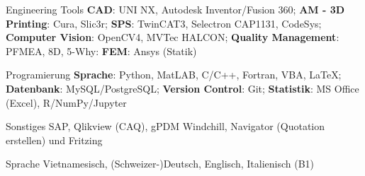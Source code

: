 

\begin{cvskills}


  \cvskill
    {Engineering Tools} %
    {\textbf{CAD}: UNI NX, Autodesk Inventor/Fusion 360; 
    \newline \textbf{AM - 3D Printing}: Cura, Slic3r;
    \newline \textbf{SPS}: TwinCAT3, Selectron CAP1131, CodeSys;
    \newline \textbf{Computer Vision}: OpenCV4, MVTec HALCON;
    \newline \textbf{Quality Management}: PFMEA, 8D, 5-Why:
	\newline \textbf{FEM}: Ansys (Statik)} %

%

  \cvskill
    {Programierung} %
    {\textbf{Sprache}: Python, MatLAB, C/C++, Fortran, VBA, LaTeX; 
    	\newline \textbf{Datenbank}: MySQL/PostgreSQL;
    	\newline \textbf{Version Control}: Git;
    	\newline \textbf{Statistik}: MS Office (Excel), R/NumPy/Jupyter
    	} %

  \cvskill
    {Sonstiges} %
    {SAP, Qlikview (CAQ), gPDM Windchill, Navigator (Quotation erstellen) und Fritzing} %

  \cvskill
    {Sprache} %
    {Vietnamesisch, (Schweizer-)Deutsch, Englisch, Italienisch (B1)} %

\end{cvskills}
